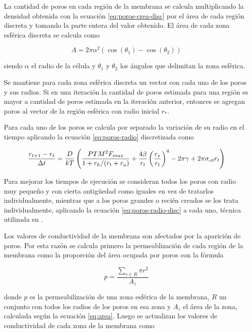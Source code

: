 La cantidad de poros en cada región de la membrana se calcula multiplicando la densidad obtenida con la ecuación \ref{eq:poros-crea-disc} por el área de cada región discreta y tomando la parte entera del valor obtenido. El área de cada zona esférica discreta se calcula como 

\begin{equation} \label{eq:area}
	A = 2 \pi \alpha^2 (\cos(\theta_1) - \cos(\theta_2))
\end{equation}

siendo $\alpha$ el radio de la célula y $\theta_1$ y $\theta_2$ los ángulos que delimitan la zona esférica.

Se mantiene para cada zona esférica discreta un vector con cada uno de los poros y sus radios. Si en una iteración la cantidad de poros estimada para una región es mayor a cantidad de poros estimada en la iteración anterior, entonces se agregan poros al vector de la región esférica con radio inicial $r_*$.

Para cada uno de los poros se calcula por separado la variación de su radio en el tiempo aplicando la ecuación \ref{eq:poros-radio} discretizada como

\begin{equation} \label{eq:poros-radio-disc}
	\frac{r_{t+1} - r_t}{\Delta t} = \frac{D}{kT} \left( \frac{PTM^2 F_{max}}{1+r_h / (r_t+r_a)} + \frac{4 \beta}{r_t} \left(\frac{r_*}{r_t}\right)^4 - 2 \pi \gamma + 2 \pi \sigma_{\textrm{\tiny eff}} r_t \right)
\end{equation}

Para mejorar los tiempos de ejecución se consideran todos los poros con radio muy pequeño y con cierta antigüedad como iguales en vez de tratarlos individualmente, mientras que a los poros grandes o recién creados se los trata individualmente, aplicando la ecuación \ref{eq:poros-radio-disc} a cada uno, técnica utilizada en \cite{krass07}.

Los valores de conductividad de la membrana son afectados por la aparición de poros. Por esta razón se calcula primero la permeablización de cada región de la membrana como la proporción del área ocupada por poros con la fórmula

\begin{equation} 
    p = \frac{ \sum\limits_{r \in R} \pi r^2 }{A_z}
\end{equation} 

donde $p$ es la permeabilización de una zona esférica de la membrana, $R$ un conjunto con todos los radios de los poros en esa zona y $A_z$ el área de la zona, calculada según la ecuación \ref{eq:area}. Luego se actualizan los valores de conductividad de cada zona de la membrana como

